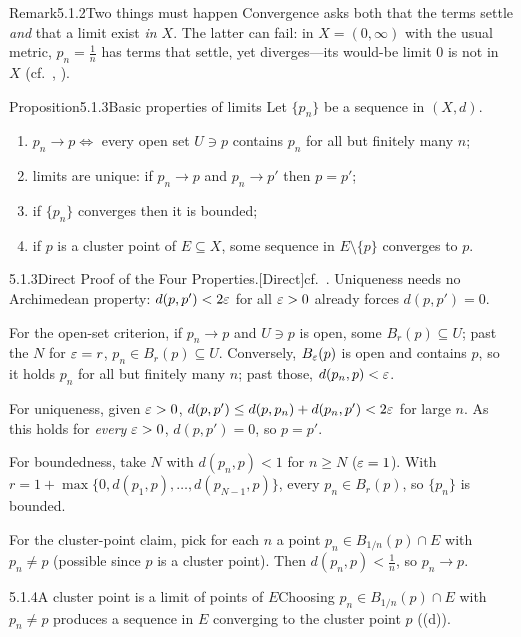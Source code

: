 \documentclass[main.tex]{subfiles}
\begin{document}
\begin{ObjL}{Remark}{5.1.2}{Two things must happen}
Convergence asks both that the terms settle \emph{and} that a limit exist \emph{in $X$}. The latter
can fail: in $X=(0,\infty)$ with the usual metric, $p_n=\tfrac1n$ has terms that settle, yet
diverges---its would-be limit $0$ is not in $X$ (cf.\ , ).
\end{ObjL}

\begin{Obj}{Proposition}{5.1.3}{Basic properties of limits}
Let $\{p_n\}$ be a sequence in $(X,d)$.
\begin{enumerate}
  \item $p_n\to p\iff$ every open set $U\ni p$ contains $p_n$ for all but finitely many $n$;
  \item limits are unique: if $p_n\to p$ and $p_n\to p'$ then $p=p'$;
  \item if $\{p_n\}$ converges then it is bounded;
  \item if $p$ is a cluster point of $E\subseteq X$, some sequence in $E\setminus\{p\}$ converges to $p$.
\end{enumerate}
\end{Obj}
\begin{Prf}{5.1.3}{Direct Proof of the Four Properties.}{[Direct]\quad cf.\ . Uniqueness needs no Archimedean property: $d(p,p')<2\varepsilon$ for all $\varepsilon>0$ already forces $d(p,p')=0$.}
\item For the open-set criterion, if $p_n\to p$ and $U\ni p$ is open, some $B_r(p)\subseteq U$; past
  the $N$ for $\varepsilon=r$, $p_n\in B_r(p)\subseteq U$. Conversely, $B_\varepsilon(p)$ is open and contains $p$,
  so it holds $p_n$ for all but finitely many $n$; past those, $d(p_n,p)<\varepsilon$.
\item For uniqueness, given $\varepsilon>0$, $d(p,p')\le d(p,p_n)+d(p_n,p')<2\varepsilon$ for large $n$. As this
  holds for \emph{every} $\varepsilon>0$, $d(p,p')=0$, so $p=p'$.
\item For boundedness, take $N$ with $d(p_n,p)<1$ for $n\ge N$ ($\varepsilon=1$). With $r=1+\max\{0,d(p_1,p),
  \dots,d(p_{N-1},p)\}$, every $p_n\in B_r(p)$, so $\{p_n\}$ is bounded.
\item For the cluster-point claim, pick for each $n$ a point $p_n\in B_{1/n}(p)\cap E$ with $p_n\neq
  p$ (possible since $p$ is a cluster point). Then $d(p_n,p)<\tfrac1n$, so $p_n\to p$.
\end{Prf}

\begin{Fig}{5.1.4}{A cluster point is a limit of points of $E$}{Choosing $p_n\in B_{1/n}(p)\cap E$ with $p_n\neq p$ produces a sequence in $E$ converging to the cluster point $p$ ((d)).}
\end{Fig}
\end{document}
